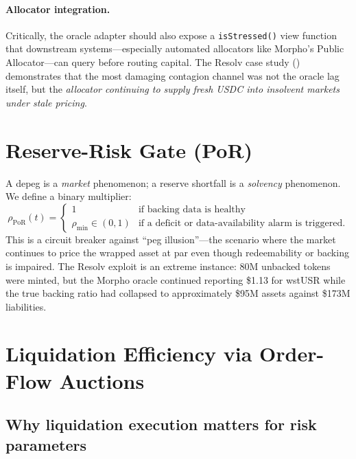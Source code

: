 \documentclass[11pt]{article}
\begin{document}
\paragraph{Allocator integration.} Critically, the oracle adapter should also expose a \texttt{isStressed()} view function that downstream systems---especially automated allocators like Morpho's Public Allocator---can query before routing capital. The Resolv case study () demonstrates that the most damaging contagion channel was not the oracle lag itself, but the \emph{allocator continuing to supply fresh USDC into insolvent markets under stale pricing}.

\section{Reserve-Risk Gate (PoR)}
\label{sec:por}

A depeg is a \emph{market} phenomenon; a reserve shortfall is a \emph{solvency} phenomenon. We define a binary multiplier:
\[
\rho_{\mathrm{PoR}}(t)=\begin{cases}
1 & \text{if backing data is healthy}\\
\rho_{\min}\in(0,1) & \text{if a deficit or data-availability alarm is triggered.}
\end{cases}
\]
This is a circuit breaker against ``peg illusion''---the scenario where the market continues to price the wrapped asset at par even though redeemability or backing is impaired. The Resolv exploit is an extreme instance: 80M unbacked tokens were minted, but the Morpho oracle continued reporting \$1.13 for wstUSR while the true backing ratio had collapsed to approximately \$95M assets against \$173M liabilities.

\section{Liquidation Efficiency via Order-Flow Auctions}
\label{sec:atlas}

\subsection{Why liquidation execution matters for risk parameters}
\end{document}
